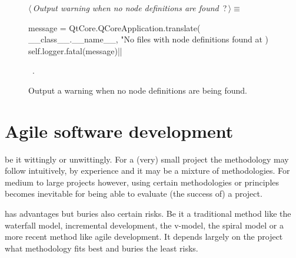 \documentclass[%
    a4paper,    %
    justified,  %
    nobib,      %
    openany     %
]{tufte-book}
\makeatletter
\renewcommand{\label}[1]{\@tufte@label{##1}}%
\makeatother
\begin{document}
\begin{figure}[!h]
  \begin{flushleft} \small
\begin{minipage}{\linewidth}\label{scrap10}\raggedright\small
{} $\langle\,${\itshape Output warning when no node definitions are found}\nobreak\ {\footnotesize {?}}$\,\rangle\equiv$
\vspace{-1ex}
\begin{pythoncode}
    message = QtCore.QCoreApplication.translate(
        __class__.__name__,
        "No files with node definitions found at %
    )
    self.logger.fatal(message)|\NWsep|
\end{pythoncode}
\vspace{1.5ex}
\footnotesize
\begin{list}{}{\setlength{\itemsep}{-\parsep}\setlength{\itemindent}{-\leftmargin}}
\item \NWtxtMacroRefIn\ .

\item{}
\end{list}
\end{minipage}\vspace{4ex}
\end{flushleft}
\caption{Output a warning when no node definitions are being found.}
  \label{lst:nodes-controller-load-node-defs-warning-2}
\end{figure}

\section{Agile software development}
\label{sec:agile-software-development}

 be it wittingly
or unwittingly. For a (very) small project the methodology may follow intuitively,
by experience and it may be a mixture of methodologies. For medium to large
projects however, using certain methodologies or principles becomes inevitable
for being able to evaluate (the success of) a project.

 has advantages
but buries also certain risks. Be it a traditional method like the waterfall
model, incremental development, the v-model, the spiral model or a more recent
method like agile development. It depends largely on the project what
methodology fits best and buries the least risks.~\cite{haneen-risk-2012,
mens-se-2008}
\end{document}
